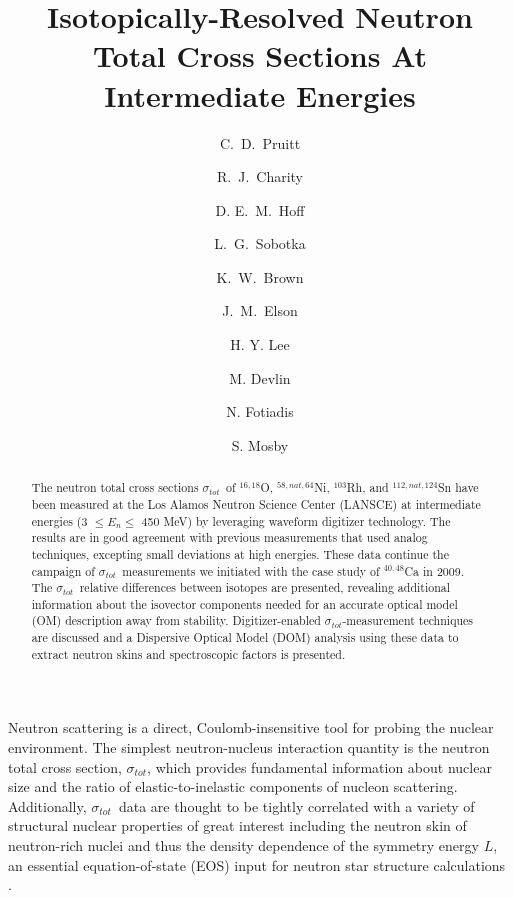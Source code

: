 \documentclass[twocolumn,secnumarabic,amssymb, nobibnotes, aps, prl,
superscriptaddress, nobalancelastpage]{revtex4}
\newcommand{\tot}{\ensuremath{\sigma_{tot}}}
\begin{document}
\begin{abstract}
    The neutron total cross sections \tot\ of $^{16,18}$O,
    $^{58,nat,64}$Ni, $^{103}$Rh, and $^{112,nat,124}$Sn have been measured at the Los Alamos
    Neutron Science Center (LANSCE) at intermediate energies (3 $\leq E_{n}
    \leq$ 450 MeV) by
    leveraging waveform digitizer technology. The results are in good agreement
    with previous measurements that used analog techniques,
    excepting small deviations at high energies. These data
    continue the campaign of
    \tot\ measurements we initiated with the case study of $^{40,48}$Ca in 2009.
    The \tot\ relative differences between isotopes are presented,
    revealing additional information about
    the isovector components needed for an accurate optical model (OM)
    description away from stability. Digitizer-enabled \tot-measurement
    techniques are discussed and a Dispersive Optical Model (DOM)
    analysis using these data to extract neutron skins and spectroscopic factors
    is presented.
\end{abstract}

\title{Isotopically-Resolved Neutron Total Cross Sections At
Intermediate Energies}

\author{C.~D.~Pruitt}  
\author{R.~J.~Charity}
\author{D. E.~M.~Hoff}  
\author{L.~G.~Sobotka}
\author{K.~W.~Brown} 
\author{J.~M.~Elson}

\author{H. Y. Lee}
\author{M. Devlin}
\author{N. Fotiadis}
\author{S. Mosby}
\maketitle

Neutron scattering is a direct, Coulomb-insensitive tool for probing the nuclear
environment. The simplest neutron-nucleus interaction quantity is 
the neutron total cross section, \tot, which provides fundamental information about
nuclear size and the ratio of elastic-to-inelastic components of nucleon 
scattering. Additionally, \tot\ data are thought to be tightly correlated with
a variety of structural nuclear properties of great interest
including the neutron skin of neutron-rich nuclei
\cite{Mahzoon2017} and thus the density dependence of the symmetry energy $L$,
an essential equation-of-state (EOS) input for neutron star
structure calculations \cite{Fattoyev2012, Vinas2014, Brown2000}.
\end{document}
